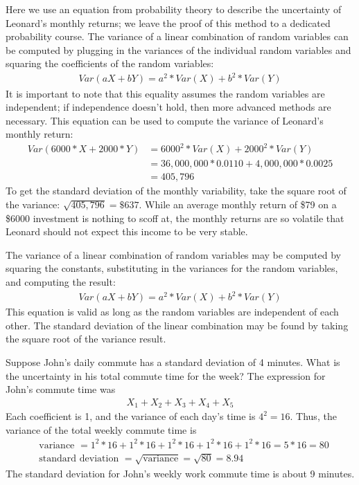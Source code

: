 Here we use an equation from probability theory to describe the uncertainty of Leonard's monthly returns; we leave the proof of this method to a dedicated probability course. The variance of a linear combination of random variables can be computed by plugging in the variances of the individual random variables and squaring the coefficients of the random variables:
\begin{align*}
Var(aX + bY) = a^2*Var(X) + b^2*Var(Y)
\end{align*}
It is important to note that this equality assumes the random variables are independent; if independence doesn't hold, then more advanced methods are necessary. This equation can be used to compute the variance of Leonard's monthly return:
\begin{align*}
Var(6000*X + 2000*Y)
	&= 6000^2*Var(X) + 2000^2*Var(Y) \\
	&= 36,000,000*0.0110 + 4,000,000*0.0025 \\
	&= 405,796
\end{align*}
To get the standard deviation of the monthly variability, take the square root of the variance: $\sqrt{405,796} = \$637$. While an average monthly return of \$79 on a \$6000 investment is nothing to scoff at, the monthly returns are so volatile that Leonard should not expect this income to be very stable.

\begin{termBox}{
The variance of a linear combination of random variables may be computed by squaring the constants, substituting in the variances for the random variables, and computing the result:
\begin{align*}
Var(aX + bY) = a^2*Var(X) + b^2*Var(Y)
\end{align*}
This equation is valid as long as the random variables are independent of each other. The standard deviation of the linear combination may be found by taking the square root of the variance result.}
\end{termBox}

\begin{example}{Suppose John's daily commute has a standard deviation of 4 minutes. What is the uncertainty in his total commute time for the week?} \label{sdOfJohnsCommuteWeeklyTime}
The expression for John's commute time was
\begin{align*}
X_1 + X_2 + X_3 + X_4 + X_5
\end{align*}
Each coefficient is 1, and the variance of each day's time is $4^2=16$. Thus, the variance of the total weekly commute time is
\begin{align*}
&\text{variance }= 1^2 * 16 + 1^2 * 16 + 1^2 * 16 + 1^2 * 16 + 1^2 * 16 = 5*16 = 80 \\
&\text{standard deviation } = \sqrt{\text{variance}} = \sqrt{80} = 8.94
\end{align*}
The standard deviation for John's weekly work commute time is about 9 minutes.
\end{example}

